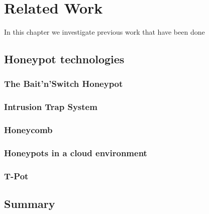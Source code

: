 \chapter{Related Work}

In this chapter we investigate previous work that have been done

\section{Honeypot technologies}



\subsection{The Bait'n'Switch Honeypot}

\cite{Diebold2005}

\subsection{Intrusion Trap System}

\cite{Diebold2005}

\subsection{Honeycomb}

\cite{Diebold2005}

\subsection{Honeypots in a cloud environment}

\cite{Kelly2021}

\subsection{T-Pot}



\section{Summary}